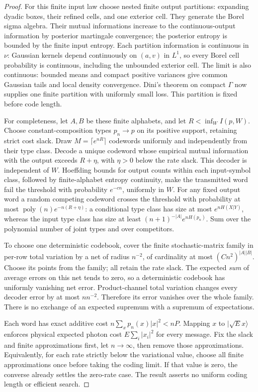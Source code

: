 \documentclass[11pt]{article}
\begin{document}
\begin{proof}
For this finite input law choose nested finite output partitions:
expanding dyadic boxes, their refined cells, and one exterior cell.
They generate the Borel sigma algebra. Their mutual informations
increase to the continuous-output information by posterior martingale
convergence; the posterior entropy is bounded by the finite input entropy.
Each partition information is continuous in \(\nu\): Gaussian kernels
depend continuously on \((a,v)\) in \(L^1\), so every Borel cell
probability is continuous, including the unbounded exterior cell.
The limit is also continuous: bounded means and compact positive
variances give common Gaussian tails and local density convergence.
Dini's theorem on compact \(\Gamma\) now supplies one finite partition
with uniformly small loss. This partition is fixed before code length.

For completeness, let \(A,B\) be these finite alphabets, and let
\(R<\inf_W I(p,W)\). Choose constant-composition types \(p_n\to p\)
on its positive support, retaining strict cost slack.
Draw \(M=\lceil e^{nR}\rceil\) codewords uniformly and independently
from their type class. Decode a unique codeword whose empirical mutual
information with the output exceeds \(R+\eta\), with \(\eta>0\)
below the rate slack. This decoder is independent of \(W\).
Hoeffding bounds for output counts within each input-symbol class,
followed by finite-alphabet entropy continuity, make the transmitted
word fail the threshold with probability \(e^{-cn}\), uniformly in \(W\).
For any fixed output word a random competing codeword crosses the
threshold with probability at most
\(\operatorname{poly}(n)e^{-n(R+\eta)}\):
a conditional type class has size at most \(e^{nH(X|Y)}\),
whereas the input type class has size at least
\((n+1)^{-|A|}e^{nH(p_n)}\). Sum over the polynomial number of joint
types and over competitors.

To choose one deterministic codebook, cover the finite stochastic-matrix
family in per-row total variation by a net of radius \(n^{-2}\),
of cardinality at most \((Cn^2)^{|A||B|}\).
Choose its points from the family; all retain the rate slack.
The expected \emph{sum} of average errors on this net tends to zero,
so a deterministic codebook has uniformly vanishing net error.
Product-channel total variation changes every decoder error by at most
\(n n^{-2}\). Therefore its error vanishes over the whole family.
There is no exchange of an expected supremum with a supremum of expectations.

Each word has exact additive cost \(n\sum_xp_n(x)|x|^2<nP\).
Mapping \(x\) to \(|\sqrt E x\rangle\) enforces physical expected
photon cost \(E\sum_i|x_i|^2\) for every message.
Fix the slack and finite approximations first, let \(n\to\infty\),
then remove those approximations. Equivalently, for each rate strictly
below the variational value, choose all finite approximations once before
taking the coding limit. If that value is zero, the converse already
settles the zero-rate case. The result asserts no uniform
coding length or efficient search.
\end{proof}
\end{document}
